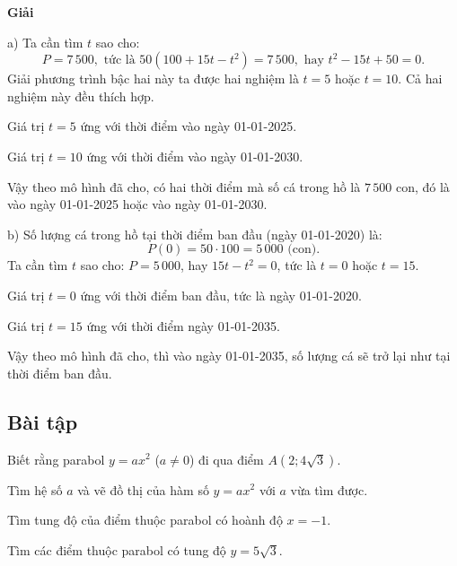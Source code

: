 \begin{exercises}
    \textbf{Giải}

    a) Ta cần tìm $t$ sao cho:
    \[
        P=7\,500,\text{ tức là }50(100+15t-t^2)=7\,500,\text{ hay }t^2-15t+50=0.
    \]
    Giải phương trình bậc hai này ta được hai nghiệm là $t=5$ hoặc $t=10$. Cả hai nghiệm này đều thích hợp.

    Giá trị $t=5$ ứng với thời điểm vào ngày 01-01-2025.

    Giá trị $t=10$ ứng với thời điểm vào ngày 01-01-2030.

    Vậy theo mô hình đã cho, có hai thời điểm mà số cá trong hồ là $7\,500$ con, đó là vào ngày 01-01-2025 hoặc vào ngày 01-01-2030.

    b) Số lượng cá trong hồ tại thời điểm ban đầu (ngày 01-01-2020) là:
    \[
        P(0)=50\cdot 100=5\,000\text{ (con)}.
    \]
    Ta cần tìm $t$ sao cho: $P=5\,000$, hay $15t-t^2=0$, tức là $t=0$ hoặc $t=15$.

    Giá trị $t=0$ ứng với thời điểm ban đầu, tức là ngày 01-01-2020.

    Giá trị $t=15$ ứng với thời điểm ngày 01-01-2035.

    Vậy theo mô hình đã cho, thì vào ngày 01-01-2035, số lượng cá sẽ trở lại như tại thời điểm ban đầu.

    \subsection{Bài tập}

    \begin{questions}[resume=SGK]
        \item Biết rằng parabol $y=ax^2$ ($a\ne 0$) đi qua điểm $A(2;4\sqrt{3})$.
        \begin{questions}
            \item Tìm hệ số $a$ và vẽ đồ thị của hàm số $y=ax^2$ với $a$ vừa tìm được.

            \answerline
            \answerline
            \answerline
            \answerline

            \item Tìm tung độ của điểm thuộc parabol có hoành độ $x=-1$.

            \answerline
            \answerline

            \item Tìm các điểm thuộc parabol có tung độ $y=5\sqrt{3}$.

            \answerline
            \answerline
        \end{questions}


\end{questions}
\end{exercises}
